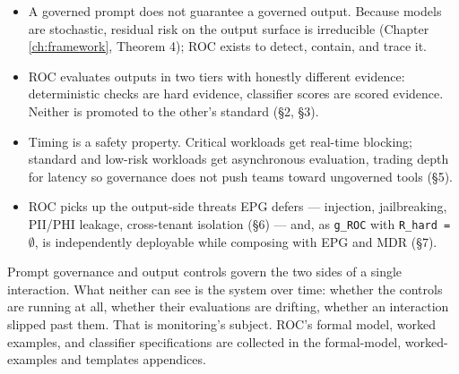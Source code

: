 \begin{itemize}
  \item A governed prompt does not guarantee a governed output. Because models are stochastic, residual risk on the output surface is irreducible (Chapter \ref{ch:framework}, Theorem 4); ROC exists to detect, contain, and trace it.
  \item ROC evaluates outputs in two tiers with honestly different evidence: deterministic checks are hard evidence, classifier scores are scored evidence. Neither is promoted to the other's standard (\S{}2, \S{}3).
  \item Timing is a safety property. Critical workloads get real-time blocking; standard and low-risk workloads get asynchronous evaluation, trading depth for latency so governance does not push teams toward ungoverned tools (\S{}5).
  \item ROC picks up the output-side threats EPG defers --- injection, jailbreaking, PII/PHI leakage, cross-tenant isolation (\S{}6) --- and, as \texttt{g\_\allowbreak{}ROC} with \texttt{R\_\allowbreak{}hard = $\emptyset$}, is independently deployable while composing with EPG and MDR (\S{}7).
\end{itemize}


Prompt governance and output controls govern the two sides of a single interaction. What neither can see is the system over time: whether the controls are running at all, whether their evaluations are drifting, whether an interaction slipped past them. That is monitoring's subject. ROC's formal model, worked examples, and classifier specifications are collected in the formal-model, worked-examples and templates appendices.

